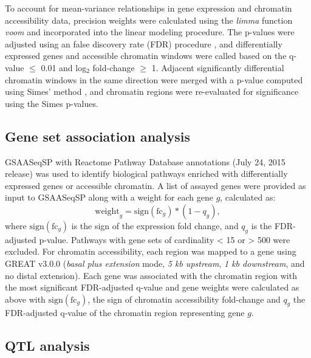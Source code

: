 \documentclass[9pt,twocolumn,twoside]{gsajnl}
\begin{document}
To account for mean-variance relationships in gene expression and chromatin accessibility data, precision weights were calculated using the \textit{limma} function \textit{voom} and incorporated into the linear modeling procedure. The p-values were adjusted using an false discovery rate (FDR) procedure \citep{Benjamini1995}, and differentially expressed genes and accessible chromatin windows were called based on the q-value $\le$ 0.01 and log$_{2}$ fold-change $\geq$ 1. Adjacent significantly differential chromatin windows in the same direction were merged with a p-value computed using Simes' method \citep{Sarkar1997}, and chromatin regions were re-evaluated for significance using the Simes p-values.

\subsection{Gene set association analysis}

GSAASeqSP \citep{Xiong2014} with Reactome Pathway Database annotations (July 24, 2015 release) was used to identify biological pathways enriched with differentially expressed genes or accessible chromatin. A list of assayed genes were provided as input to GSAASeqSP along with a weight for each gene $g$, calculated as:
\begin{equation}
\text{weight}_{g} = \text{sign}(\text{fc}_{g}) * (1-q_{g}),
\label{eq:gene_weighting}
\end{equation}
where $\text{sign}(\text{fc}_{g})$ is the sign of the expression fold change, and $q_{g}$ is the FDR-adjusted p-value. Pathways with gene sets of cardinality < 15 or > 500 were excluded. For chromatin accessibility, each region was mapped to a gene using GREAT v3.0.0 (\textit{basal plus extension} mode, \textit{5 kb upstream}, \textit{1 kb downstream}, and no distal extension). Each gene was associated with the chromatin region with the most significant FDR-adjusted q-value and gene weights were calculated as above with $\text{sign}(\text{fc}_{g})$, the sign of chromatin accessibility fold-change and $q_{g}$ the FDR-adjusted q-value of the chromatin region representing gene $g$.

\subsection{QTL analysis}
\end{document}

